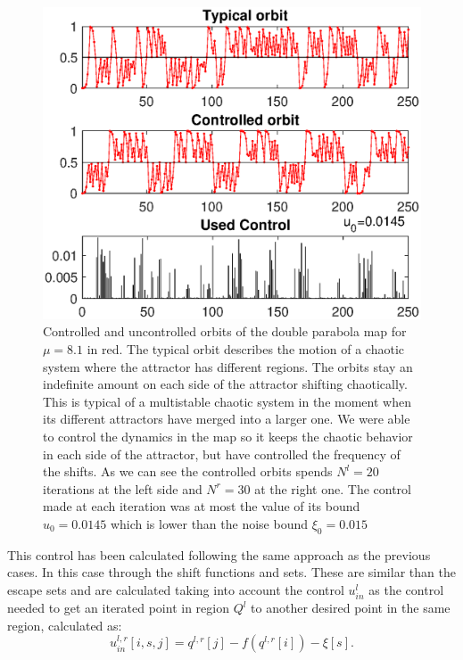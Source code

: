 \begin{figure}
    \centering
    \includegraphics[width=0.7\textheight]{Images/P1/Alt_tray_mu8.1.eps}
    \caption{Controlled and uncontrolled orbits of the double parabola map for $\mu = 8.1$ in red. The typical orbit describes the motion of a chaotic system where the attractor has different regions. The orbits stay an indefinite amount on each side of the attractor shifting chaotically. This is typical of a multistable chaotic system in the moment when its different attractors have merged into a larger one. We were able to control the dynamics in the map so it keeps the chaotic behavior in each side of the attractor, but have controlled the frequency of the shifts. As we can see the controlled orbits spends $N^l = 20$ iterations at the left side and $N^r = 30$ at the right one. The control made at each iteration was at most the value of its bound $u_0 = 0.0145$ which is lower than the noise bound $\xi_0 = 0.015$}
    \label{fig:TrajectoryDouble}
\end{figure}



This control has been calculated following the same approach as the previous cases. In this case through the shift functions and sets. These are similar than the escape sets and are calculated taking into account the control $u_{in}^l$ as the control needed to get an iterated point in region $Q^l$ to another desired point in the same region, calculated as:
\begin{equation*}
u_{in}^{l,r}[i,s,j] =  q^{l,r}[j] - f(q^{l,r}[i]) - \xi[s].
\end{equation*}

